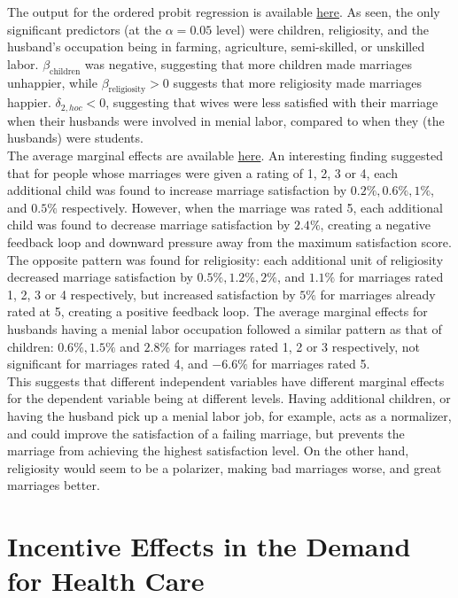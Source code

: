 \documentclass{article}
\begin{document}
\begin{enumerate}[label=(\alph*)]
The output for the ordered probit regression is available \hyperlink{oprobit}{here}. As seen, the only significant predictors (at the $\alpha = 0.05$ level) were children, religiosity, and the husband's occupation being in farming, agriculture, semi-skilled, or unskilled labor. $\beta_{\text{children}}$ was negative, suggesting that more children made marriages unhappier, while $\beta_{\text{religiosity}} > 0$ suggests that more religiosity made marriages happier. $\delta_{2,hoc} < 0$, suggesting that wives were less satisfied with their marriage when their husbands were involved in menial labor, compared to when they (the husbands) were students.\\

The average marginal effects are available \hyperlink{oprobitame}{here}. An interesting finding suggested that for people whose marriages were given a rating of 1, 2, 3 or 4, each additional child was found to increase marriage satisfaction by $0.2\%, 0.6\%, 1\%$, and $0.5\%$ respectively. However, when the marriage was rated 5, each additional child was found to decrease marriage satisfaction by $2.4\%$, creating a negative feedback loop and downward pressure away from the maximum satisfaction score. The opposite pattern was found for religiosity: each additional unit of religiosity decreased marriage satisfaction by $0.5\%, 1.2\%, 2\%$, and $1.1\%$ for marriages rated 1, 2, 3 or 4 respectively, but increased satisfaction by $5\%$ for marriages already rated at 5, creating a positive feedback loop. The average marginal effects for husbands having a menial labor occupation followed a similar pattern as that of children: $0.6\%, 1.5\%$ and $2.8\%$ for marriages rated 1, 2 or 3 respectively, not significant for marriages rated 4, and $-6.6\%$ for marriages rated 5.\\

This suggests that different independent variables have different marginal effects for the dependent variable being at different levels. Having additional children, or having the husband pick up a menial labor job, for example, acts as a normalizer, and could improve the satisfaction of a failing marriage, but prevents the marriage from achieving the highest satisfaction level. On the other hand, religiosity would seem to be a polarizer, making bad marriages worse, and great marriages better.


 

\end{enumerate}


\newpage
\section{Incentive Effects in the Demand for Health Care}
\end{document}
